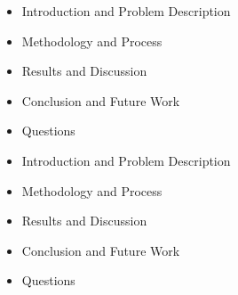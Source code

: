 
\begin{frame}

  \begin{itemize}
    \item Introduction and Problem Description
    \item Methodology and Process
    \item Results and Discussion  
    \item Conclusion and Future Work
    \item Questions
  \end{itemize}
  
\end{frame}

\begin{frame}

  \begin{itemize}
    \item Introduction and Problem Description
    \item Methodology and Process
    \item Results and Discussion  
    \item Conclusion and Future Work
    \item Questions
  \end{itemize}
  
\end{frame}
